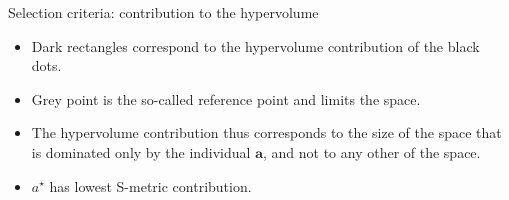 \begin{frame}[allowframebreaks]{Selection criteria: contribution to the hypervolume}
\footnotesize
\vspace*{-0.5cm}
\begin{itemize}
\item Dark rectangles correspond to the hypervolume contribution of the black dots.
\item Grey point is the so-called reference point and limits the space.
\item The hypervolume contribution thus corresponds to the size of the space that is dominated only by the individual $\bm{a}$, and not to any other of the space.
\item $a^\star$ has lowest S-metric contribution.
\end{itemize}
\end{frame}





